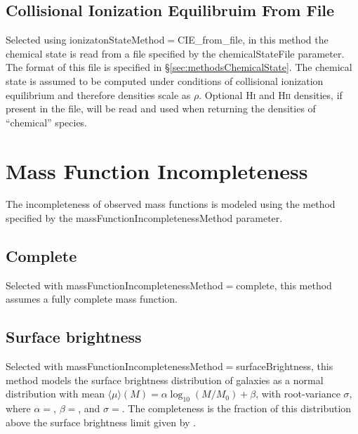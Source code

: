 \subsection{Collisional Ionization Equilibruim From File}

Selected using {\normalfont \ttfamily ionizatonStateMethod}$=${\normalfont \ttfamily CIE\_from\_file}, in this method the chemical state is read from a file specified by the {\normalfont \ttfamily chemicalStateFile} parameter. The format of this file is specified in \S\ref{sec:methodsChemicalState}. The chemical state is assumed to be computed under conditions of collisional ionization equilibrium and therefore densities scale as $\rho$. Optional H{\normalfont \scshape i} and H{\normalfont \scshape ii} densities, if present in the file, will be read and used when returning the densities of ``chemical'' species.

\section{Mass Function Incompleteness}

The incompleteness of observed mass functions is modeled using the method specified by the {\normalfont \ttfamily massFunctionIncompletenessMethod} parameter.

\subsection{Complete}\label{phys:massFunctionIncompleteness:massFunctionIncompletenessComplete}

Selected with {\normalfont \ttfamily massFunctionIncompletenessMethod}$=${\normalfont \ttfamily complete}, this method assumes a fully complete mass function.

\subsection{Surface brightness}\label{phys:massFunctionIncompleteness:massFunctionIncompletenessSurfaceBrightness}

Selected with {\normalfont \ttfamily massFunctionIncompletenessMethod}$=${\normalfont \ttfamily surfaceBrightness}, this method models the surface brightness distribution of galaxies as a normal distribution with mean $\langle \mu \rangle (M) = \alpha \log_{10}(M/M_0)+\beta$, with root-variance $\sigma$, where $\alpha=${\normalfont \ttfamily [massFunctionIncompletenessSurfaceBrightnessModelSlope]}, $\beta=${\normalfont \ttfamily [massFunctionIncompletenessSurfaceBrightnessZeroPoint]}, and $\sigma=${\normalfont \ttfamily [massFunctionIncompletenessSurfaceBrightnessModelScatter]}. The completeness is the fraction of this distribution above the surface brightness limit given by {\normalfont \ttfamily [massFunctionIncompletenessSurfaceBrightnessLimit]}.


